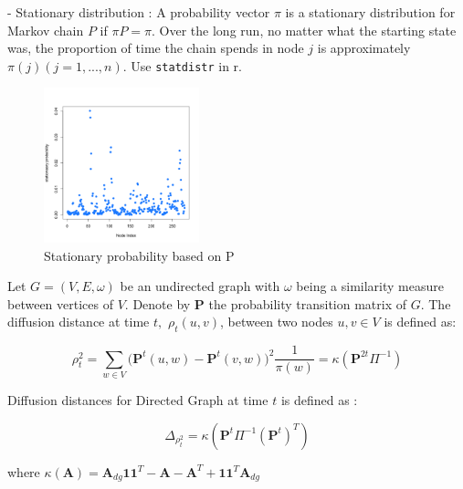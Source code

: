 \documentclass[12pt]{report}
\begin{document}
- Stationary distribution 
: A probability vector $\pi$ is a stationary distribution for Markov chain $P$ if $\pi P = \pi$. Over the long run, no matter what the starting state was, the proportion of time the chain spends in node $j$ is approximately $\pi(j) (j = 1, ... , n)$.
Use \verb!statdistr! in r.


\begin{figure}[H]
\captionsetup{format=plain}
\centering
\includegraphics[width=0.4\textwidth]{../figure/statd.png}
\caption{Stationary probability based on P}
\label{fig:statd}
\end{figure}


  Let $G = (V, E, \omega)$ be an undirected graph with $\omega$ being a similarity measure between vertices of $V.$ Denote by $\textbf{P}$ the probability transition matrix of $G.$ The diffusion distance at time $t,$ $\rho_{t}(u,v)$, between two nodes $u,v \in V$ is defined as:
  
  $$\rho^2_{t} = \sum\limits_{w \in V}\big( \textbf{P}^{t}(u,w) - \textbf{P}^{t}(v,w) \big)^2 \frac{1}{\pi(w)} =  \kappa(\textbf{P}^{2t} \Pi^{-1} )$$

 
Diffusion distances for Directed Graph at time $t$ is defined as :

$$\Delta_{\rho^{2}_{t}} = \kappa(\textbf{P}^{t} \Pi^{-1} (\textbf{P}^{t})^{T} )$$
 
where $\kappa(\textbf{A}) = \textbf{A}_{dg} \textbf{1} \textbf{1}^{T} - \textbf{A} - \textbf{A}^{T} + \textbf{1} \textbf{1}^{T} \textbf{A}_{dg}$ 
\end{document}

